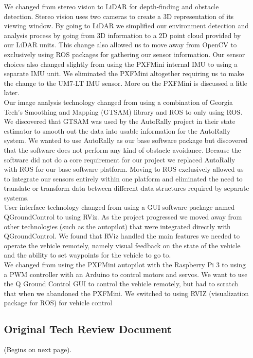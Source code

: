 \documentclass[compsoc,draftclsnofoot,onecolumn,10pt]{IEEEtran}
\begin{document}
We changed from stereo vision to LiDAR for depth-finding and obstacle detection. 
Stereo vision uses two cameras to create a 3D representation of its viewing window. 
By going to LiDAR we simplified our environment detection and analysis process by going from 3D information to a 2D point cloud provided by our LiDAR units. 
This change also allowed us to move away from OpenCV to exclusively using ROS packages for gathering our sensor information. 
Our sensor choices also changed slightly from using the PXFMini internal IMU to using a separate IMU unit. 
 We eliminated the PXFMini altogether requiring us to make the change to the UM7-LT IMU sensor. 
More on the PXFMini is discussed a litle later.\\

Our image analysis technology changed from using a combination of Georgia Tech's Smoothing and Mapping (GTSAM) library and ROS to only using ROS. 
We discovered that GTSAM was used by the AutoRally project in their state estimator to smooth out the data into usable information for the AutoRally system. 
We wanted to use AutoRally as our base software package but discovered that the software does not perform any kind of obstacle avoidance. 
Because the software did not do a core requirement for our project we replaced AutoRally with ROS for our base software platform. 
Moving to ROS exclusively allowed us to integrate our sensors entirely within one platform and eliminated the need to translate or transform data between different data structures required by separate systems.\\

User interface technology changed from using a GUI software package named QGroundControl to using RViz. 
As the project progressed we moved away from other technologies (such as the autopilot) that were integrated directly with QGroundControl. 
We found that RViz handled the main features we needed to operate the vehicle remotely, namely visual feedback on the state of the vehicle and the ability to set waypoints for the vehicle to go to.\\

We changed from using the PXFMini autopilot with the Raspberry Pi 3 to using a PWM controller with an Arduino to control motors and servos. 
We want to use the Q Ground Control GUI to control the vehicle remotely, but had to scratch that when we abandoned the PXFMini. 
We switched to using RVIZ (visualization package for ROS) for vehicle control

\subsection{Original Tech Review Document}
(Begins on next page).

\end{document}
